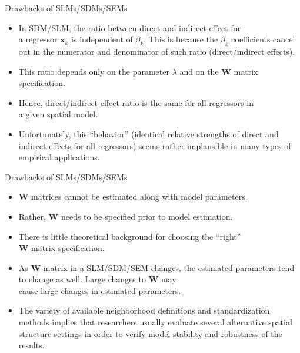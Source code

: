 \documentclass{beamer}
\begin{document}
\begin{frame}{Drawbacks of SLMs/SDMs/SEMs}
\begin{itemize}
\item In SDM/SLM, the ratio between direct and indirect effect for \\a regressor $\bm{x}_k$ is independent of $\beta_k$. This is because the $\beta_k$ coefficients cancel out in the numerator and denominator of such ratio (direct/indirect effects). 
\smallskip
\item This ratio depends only on the parameter $\lambda$ and on the $\bm{W}$ matrix specification. 
\smallskip 
\item Hence, direct/indirect effect ratio is the same for all regressors in \\a given spatial model.
\smallskip
\item Unfortunately, this ``behavior'' (identical relative strengths of direct and indirect effects for all regressors) seems rather implausible in many types of empirical applications.
\end{itemize}
\end{frame}
\begin{frame}{Drawbacks of SLMs/SDMs/SEMs}
\begin{itemize}
    \item $\bm{W}$ matrices cannot be estimated along with model parameters. 
    \medskip
    \item Rather, $\bm{W}$ needs to be specified prior to model estimation. 
    \medskip
    \item There is little theoretical background for choosing the ``right'' \\$\bm{W}$ matrix specification. 
    \medskip
    \item As $\bm{W}$ matrix in a SLM/SDM/SEM changes, the estimated parameters tend to change as well. Large changes to $\bm{W}$ may \\cause large changes in estimated parameters.
    \medskip
    \item The variety of available neighborhood definitions and standardization methods implies that researchers usually evaluate several alternative spatial structure settings in order to verify model stability and robustness of the results. 
\end{itemize}
\end{frame}
\end{document}
